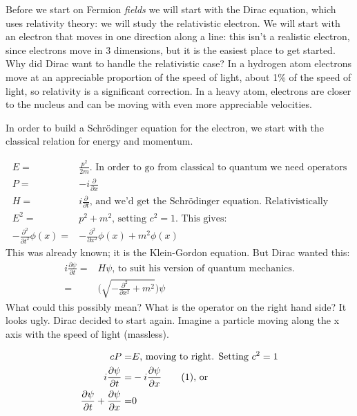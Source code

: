 \documentclass[]{article}
\newcommand\numberthis{\addtocounter{equation}{1}\tag{\theequation}}
\newcommand{\Schr}{{Schr\"odinger }}
\begin{document}
Before we start on Fermion \emph{fields} we will start with the Dirac equation, which uses relativity theory: we will study the relativistic electron. We will start with an electron that moves in one direction along a line: this isn't a realistic electron, since electrons move in 3 dimensions, but it is the easiest place to get started. Why did Dirac want to handle the relativistic case? In a hydrogen atom electrons move at an appreciable  proportion of the speed of light, about 1\% of the speed of light, so relativity is a significant correction. In a heavy atom, electrons are closer to the nucleus and can be moving with even more appreciable velocities. 

In order to build a \Schr equation for the electron, we start with the classical relation for energy and momentum.

\begin{align*}
	E =& \frac{p^2}{2m} \text {. In order to go from classical to quantum we need operators}\\
	P =& -i \frac{\partial}{\partial x} \\
	H = & i \frac{\partial}{\partial t} \text{, and we'd get the \Schr equation. Relativistically}\\
	E^2 =& p^2 + m^2 \text{, setting $c^2=1$. This gives:}\\
	-\frac{\partial^2}{\partial t^2} \phi(x) =& -\frac{\partial^2}{\partial x^2}\phi(x) + m^2 \phi(x) 
\end{align*}
This was already known; it is the Klein-Gordon equation. But Dirac wanted this:
\begin{align*}
	i \frac{\partial \psi}{\partial t} =& H\psi \text{, to suit his version of quantum mechanics.}\\
	=& \big(\sqrt{- \frac{\partial^2}{\partial x^2} + m^2}\big) \psi  
\end{align*}
What could this possibly mean? What is the operator on the right hand side? It looks ugly. Dirac decided to start again. Imagine a particle moving along the x axis with the speed of light (massless).

\begin{align*}
	c P =& E \text{, moving to right.  Setting $c^2=1$}\\
	i \frac{\partial \psi}{\partial t} =& -i \frac{\partial \psi}{\partial x} \numberthis\label{eq:dirac1:R} \text{, or}\\
	\frac{\partial \psi}{\partial t} + \frac{\partial \psi}{\partial x}=&0
\end{align*}
\end{document}
